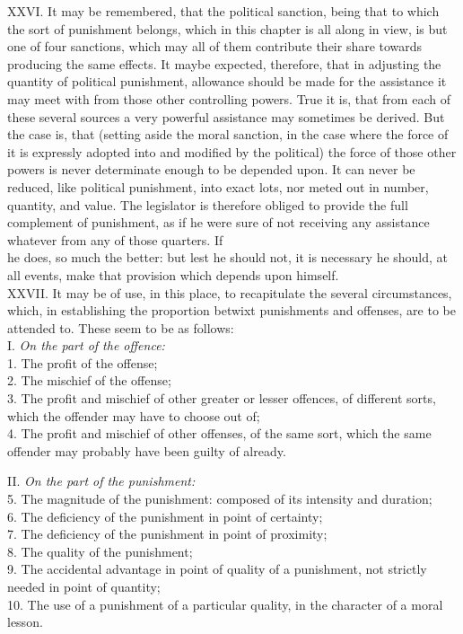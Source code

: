 \documentclass[12pt]{report}
\begin{document}
XXVI. It may be remembered, that the political sanction, being that to
which the sort of punishment belongs, which in this chapter is all along
in view, is but one of four sanctions, which may all of them contribute
their share towards producing the same effects. It maybe expected,
therefore, that in adjusting the quantity of political punishment,
allowance should be made for the assistance it may meet with from those
other controlling powers. True it is, that from each of these several
sources a very powerful assistance may sometimes be derived. But the
case is, that (setting aside the moral sanction, in the case where the
force of it is expressly adopted into and modified by the political) the
force of those other powers is never determinate enough to be depended
upon. It can never be reduced, like political punishment, into exact
lots, nor meted out in number, quantity, and value. The legislator is
therefore obliged to provide the full complement of punishment, as if he
were sure of not receiving any assistance whatever from any of those
quarters. If\\
he does, so much the better: but lest he should not, it is necessary he
should, at all events, make that provision which depends upon himself.\\
XXVII. It may be of use, in this place, to recapitulate the several
circumstances, which, in establishing the proportion betwixt punishments
and offenses, are to be attended to. These seem to be as follows:\\
I. \emph{On the part of the offence:}\\
1. The profit of the offense;\\
2. The mischief of the offense;\\
3. The profit and mischief of other greater or lesser offences, of
different sorts, which the offender may have to choose out of;\\
4. The profit and mischief of other offenses, of the same sort, which
the same offender may probably have been guilty of already.

II. \emph{On the part of the punishment:}\\
5. The magnitude of the punishment: composed of its intensity and
duration;\\
6. The deficiency of the punishment in point of certainty;\\
7. The deficiency of the punishment in point of proximity;\\
8. The quality of the punishment;\\
9. The accidental advantage in point of quality of a punishment, not
strictly needed in point of quantity;\\
10. The use of a punishment of a particular quality, in the character of
a moral lesson.
\end{document}
